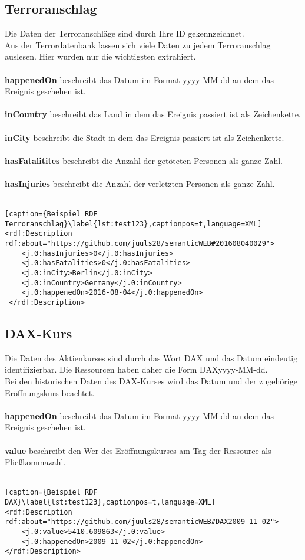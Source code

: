 \documentclass[a4paper,10pt,parskip]{article}
\begin{document}
\subsection{Terroranschlag}
Die Daten der Terroranschläge sind durch Ihre ID gekennzeichnet.\\
Aus der Terrordatenbank lassen sich viele Daten zu jedem Terroranschlag auslesen. Hier wurden nur die wichtigsten extrahiert.\\
\\
\textbf{happenedOn} beschreibt das Datum im Format yyyy-MM-dd an dem das Ereignis geschehen ist.\\
\\
\textbf{inCountry} beschreibt das Land in dem das Ereignis passiert ist als Zeichenkette.\\
\\
\textbf{inCity} beschreibt die Stadt in dem das Ereignis passiert ist als Zeichenkette.\\
\\
\textbf{hasFatalitites} beschreibt die Anzahl der getöteten Personen als ganze Zahl.\\
\\
\textbf{hasInjuries} beschreibt die Anzahl der verletzten Personen als ganze Zahl.\\
\\
\begin{lstlisting}[caption={Beispiel RDF Terroranschlag}\label{lst:test123},captionpos=t,language=XML] 
<rdf:Description rdf:about="https://github.com/juuls28/semanticWEB#201608040029">
    <j.0:hasInjuries>0</j.0:hasInjuries>
    <j.0:hasFatalities>0</j.0:hasFatalities>
    <j.0:inCity>Berlin</j.0:inCity>
    <j.0:inCountry>Germany</j.0:inCountry>
    <j.0:happenedOn>2016-08-04</j.0:happenedOn>
 </rdf:Description>
\end{lstlisting}
\newpage
\subsection{DAX-Kurs}
Die Daten des Aktienkurses sind durch das Wort DAX und das Datum eindeutig identifizierbar. Die Ressourcen haben daher die Form DAXyyyy-MM-dd.\\
Bei den historischen Daten des DAX-Kurses wird das Datum und der zugehörige Eröffnungskurs beachtet.\\
\\
\textbf{happenedOn} beschreibt das Datum im Format yyyy-MM-dd an dem das Ereignis geschehen ist.\\
\\
\textbf{value} beschreibt den Wer des Eröffnungskurses am Tag der Ressource als Fließkommazahl.\\
\\
\begin{lstlisting}[caption={Beispiel RDF DAX}\label{lst:test123},captionpos=t,language=XML] 
<rdf:Description rdf:about="https://github.com/juuls28/semanticWEB#DAX2009-11-02">
    <j.0:value>5410.609863</j.0:value>
    <j.0:happenedOn>2009-11-02</j.0:happenedOn>
</rdf:Description>
\end{lstlisting}
\end{document}
